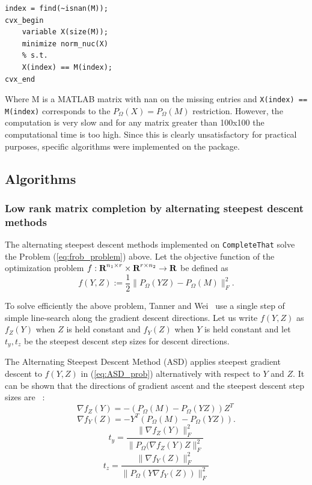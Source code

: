 \documentclass[12pt]{article}
\begin{document}
\begin{verbatim}
index = find(~isnan(M));
cvx_begin
    variable X(size(M));
    minimize norm_nuc(X)
    % s.t.
    X(index) == M(index);
cvx_end
\end{verbatim}

Where M is a MATLAB matrix with nan on the missing entries and \texttt{X(index) == M(index)} corresponds to the $P_{\Omega}(X) = P_{\Omega}(M)$ restriction. However, the computation is very slow and for any matrix greater than 100x100 the computational time is too high. Since this is clearly unsatisfactory for practical purposes, specific algorithms were implemented on the package. 

\subsection*{Algorithms}
\subsubsection*{Low rank matrix completion by alternating steepest descent methods}
The  alternating steepest descent methods implemented on \texttt{CompleteThat} solve the Problem (\ref{eq:frob_problem}) above.  Let the objective function of the optimization problem $f: {\mbox{\bf R}}^{n_1\times r}\times {\mbox{\bf R}}^{r\times n_2} \rightarrow {\mbox{\bf R}}$ be defined as
\begin{equation}
	f(Y,Z):=\frac{1}{2} \|P_{\Omega}(YZ) - P_{\Omega}(M)\|^2_F.
	\label{eq:ASD_prob}
\end{equation}

To solve efficiently the above problem, Tanner and Wei~\cite{Tanner:2014} use a single step of simple line-search along the gradient descent directions.  Let us write $f(Y, Z)$ as $f_Z(Y)$ when $Z$ is held constant and $f_Y(Z)$ when $Y$ is held constant and let $t_y, t_z$ be the steepest descent step sizes for descent directions.

The Alternating Steepest Descent Method (ASD) applies steepest gradient descent to $f(Y, Z)$ in (\ref{eq:ASD_prob}) alternatively with respect to $Y$ and $Z$. It can be shown that the directions of gradient ascent and the steepest descent step sizes are~\cite{Tanner:2014} :
\[
\nabla f_{Z}(Y) = -(P_{\Omega}(M) - P_{\Omega}(Y Z))Z^T\
\]
\[
\nabla f_{Y}(Z) = -Y^T(P_{\Omega}(M)-P_{\Omega}(YZ)).
\]
\[
t_{y} = \frac{\|  \nabla f_{Z}(Y) \|^2_F}{\| P_{\Omega}(\nabla f_{Z} (Y)Z\|^2_F}
\]
\[
 t_{z} = \frac{\|  \nabla f_{Y}(Z) \|^2_F}{\| P_{\Omega}(Y \nabla f_Y (Z)) \|^2_F}
\]
\end{document}
